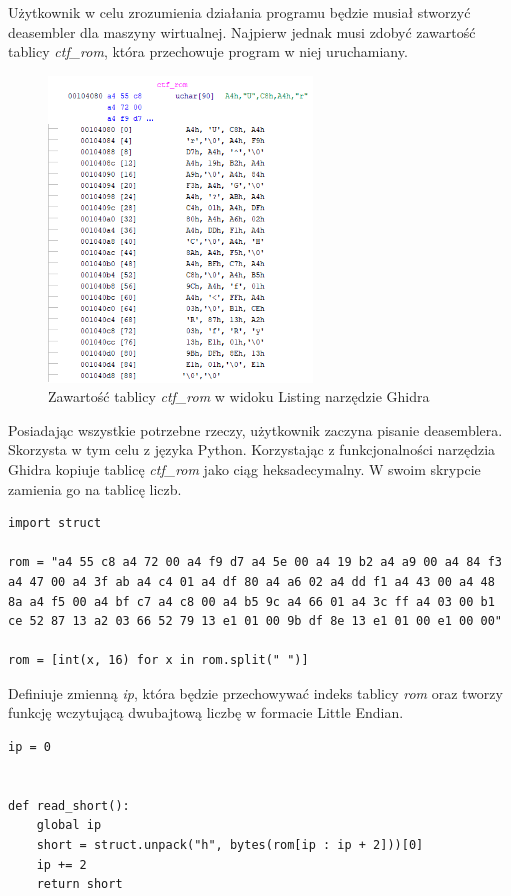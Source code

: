\documentclass[language=polish,type=eng]{aghmodern}
\begin{document}
Użytkownik w celu zrozumienia działania programu będzie musiał stworzyć deasembler dla maszyny wirtualnej.
Najpierw jednak musi zdobyć zawartość tablicy \emph{ctf\_rom}, która przechowuje program w niej uruchamiany.

\begin{figure}[H]
\centering
\includegraphics[width=7cm]{600_rom}
\caption{Zawartość tablicy \emph{ctf\_rom} w widoku Listing narzędzie Ghidra}
\end{figure}

Posiadając wszystkie potrzebne rzeczy, użytkownik zaczyna pisanie deasemblera.
Skorzysta w tym celu z języka Python. Korzystając z funkcjonalności narzędzia Ghidra
kopiuje tablicę \emph{ctf\_rom} jako ciąg heksadecymalny. W swoim skrypcie
zamienia go na tablicę liczb.

\begin{verbatim}
import struct

rom = "a4 55 c8 a4 72 00 a4 f9 d7 a4 5e 00 a4 19 b2 a4 a9 00 a4 84 f3 a4 47 00 a4 3f ab a4 c4 01 a4 df 80 a4 a6 02 a4 dd f1 a4 43 00 a4 48 8a a4 f5 00 a4 bf c7 a4 c8 00 a4 b5 9c a4 66 01 a4 3c ff a4 03 00 b1 ce 52 87 13 a2 03 66 52 79 13 e1 01 00 9b df 8e 13 e1 01 00 e1 00 00"

rom = [int(x, 16) for x in rom.split(" ")]
\end{verbatim}

Definiuje zmienną \emph{ip}, która będzie przechowywać indeks tablicy \emph{rom} oraz tworzy
funkcję wczytującą dwubajtową liczbę w formacie Little Endian.

\begin{verbatim}
ip = 0


def read_short():
    global ip
    short = struct.unpack("h", bytes(rom[ip : ip + 2]))[0]
    ip += 2
    return short
\end{verbatim}
\end{document}
